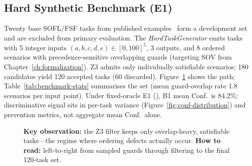 \subsection{Hard Synthetic Benchmark (E1)}

Twenty base SOFL/FSF tasks from published
examples~\citep{liu2004soflbook,li2022qrs_companion} form a development
set and are excluded from primary evaluation.
The \emph{HardTaskGenerator} emits tasks with 5 integer inputs
$(a{,}b{,}c{,}d{,}e)\in[0,100]^5$, 3 outputs, and 8 ordered scenarios with
precedence-sensitive overlapping guards (targeting SOV from
Chapter~\ref{ch:formalization}).
Z3 admits only individually satisfiable scenarios; 180 candidates yield
120 accepted tasks (60 discarded).
Figure~\ref{fig:benchmark-pipeline} shows the path; Table~\ref{tab:benchmark-stats}
summarises the set (mean guard-overlap rate 1.8 scenarios per input point).
Under fixed-oracle E1 (), B1 mean Conf.\ is 84.2\%;
discriminative signal sits in per-task variance
(Figure~\ref{fig:conf-distribution}) and prevention metrics, not aggregate
mean Conf.\ alone.

\begin{figure}[t]
  \centering
  \caption{\textbf{Key observation:} the Z3 filter keeps only overlap-heavy,
    satisfiable tasks---the regime where ordering defects actually occur.
    \textbf{How to read:} left-to-right from sampled guards through filtering
    to the final 120-task set.}
  \label{fig:benchmark-pipeline}
\end{figure}

\begin{table}[H]
  \caption{Summary statistics of the 120-task hard benchmark.}
  \label{tab:benchmark-stats}
  \centering
\end{table}

